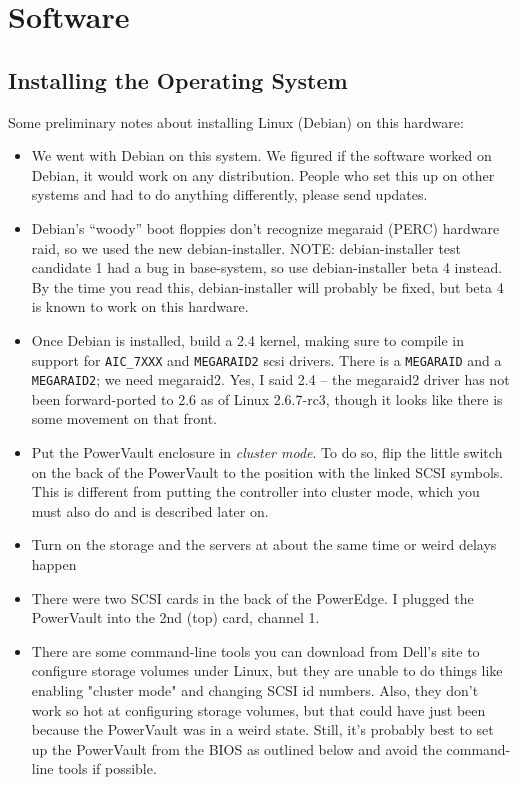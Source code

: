 \documentclass[11pt]{article}
\begin{document}
\section{Software}
\subsection{Installing the Operating System}
Some preliminary notes about installing Linux (Debian) on this hardware:

\begin{itemize}
\item We went with Debian on this system.  We figured if the software worked
  on Debian, it would work on any distribution.  People who set this up
  on other systems and had to do anything differently, please send
  updates.

\item Debian's ``woody'' boot floppies don't recognize megaraid (PERC)
  hardware raid, so we used the new debian-installer.  NOTE:
  debian-installer test candidate 1 had a bug in base-system, so use
  debian-installer beta 4 instead.  By the time you read this,
  debian-installer will probably be fixed, but beta 4 is known to work
  on this hardware.

\item Once Debian is installed, build a 2.4 kernel, making sure to compile
  in support for \texttt{AIC\_7XXX} and \texttt{MEGARAID2} scsi drivers.
  There is a \texttt{MEGARAID} and a \texttt{MEGARAID2}; we need
  megaraid2.  Yes, I said 2.4 -- the megaraid2 driver has not been
  forward-ported to 2.6 as of Linux 2.6.7-rc3, though it looks like
  there is some movement on that front. 

\item Put the PowerVault enclosure in \emph{cluster mode}.  To do so,
  flip the little switch on the back of the PowerVault to the position
  with the linked SCSI symbols.  This is different from putting the
  controller into cluster mode, which you must also do and is described
  later on.

\item Turn on the storage and the servers at about the same time or
  weird delays happen

\item There were two SCSI cards in the back of the PowerEdge. I plugged the
  PowerVault into the 2nd (top) card, channel 1.

\item There are some command-line tools you can download from Dell's
  site to configure storage volumes under Linux, but they are unable to
  do things like enabling "cluster mode" and changing SCSI id numbers.
  Also, they don't work so hot at configuring storage volumes, but that
  could have just been because the PowerVault was in a weird state.
  Still, it's probably best to set up the PowerVault from the BIOS as
  outlined below and avoid the command-line tools if possible.


\end{itemize}
\end{document}
